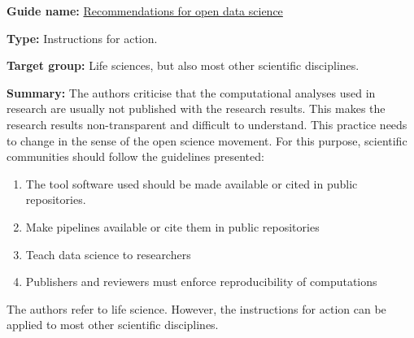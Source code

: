 \documentclass{article}
\begin{document}
\textbf{Guide name:} \href{https://gigascience.biomedcentral.com/articles/10.1186/s13742-016-0127-4}{Recommendations for open data science} \autocite{gymrek_recommendations_2016}


\textbf{Type:} Instructions for action.


\textbf{Target group:} Life sciences, but also most other scientific disciplines.


\textbf{Summary: }The authors criticise that the computational analyses used in research are usually not published with the research results. This makes the research results non-transparent and difficult to understand. This practice needs to change in the sense of the open science movement. For this purpose, scientific communities should follow the guidelines presented:

\begin{enumerate}
\item The tool software used should be made available or cited in public repositories.


\item Make pipelines available or cite them in public repositories


\item Teach data science to researchers


\item Publishers and reviewers must enforce reproducibility of computations


\end{enumerate}

The authors refer to life science. However, the instructions for action can be applied to most other scientific disciplines.


\printbibliography[title={Bibliography}]
\end{document}
